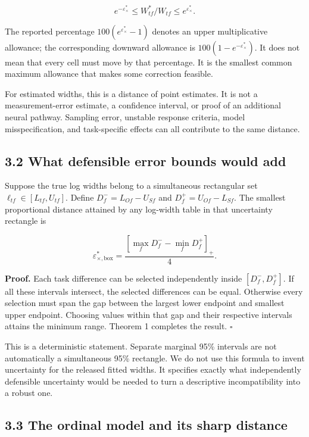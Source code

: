 \documentclass[
  11pt,
]{article}
\let\ctdoldsubsection\subsection
\renewcommand{\subsection}{\Needspace{6\baselineskip}\ctdoldsubsection}
\begin{document}
\[
e^{-\varepsilon_\times^*}
\leq W^*_{tf}/W_{tf}
\leq e^{\varepsilon_\times^*}.
\]

The reported percentage \(100(e^{\varepsilon_\times^*}-1)\) denotes an
upper multiplicative allowance; the corresponding downward allowance is
\(100(1-e^{-\varepsilon_\times^*})\). It does not mean that every cell
must move by that percentage. It is the smallest common maximum
allowance that makes some correction feasible.

For estimated widths, this is a distance of point estimates. It is not a
measurement-error estimate, a confidence interval, or proof of an
additional neural pathway. Sampling error, unstable response criteria,
model misspecification, and task-specific effects can all contribute to
the same distance.

\hypertarget{what-defensible-error-bounds-would-add}{%
\subsection{3.2 What defensible error bounds would
add}\label{what-defensible-error-bounds-would-add}}

Suppose the true log widths belong to a simultaneous rectangular set
\(\ell_{tf}\in[L_{tf},U_{tf}]\). Define \(D_f^-=L_{Of}-U_{Sf}\) and
\(D_f^+=U_{Of}-L_{Sf}\). The smallest proportional distance attained by
any log-width table in that uncertainty rectangle is

\[
\varepsilon_{\times,\mathrm{box}}^*
=\frac{[\max_f D_f^- -\min_f D_f^+]_+}{4}.
\]

\textbf{Proof.} Each task difference can be selected independently
inside \([D_f^-,D_f^+]\). If all these intervals intersect, the selected
differences can be equal. Otherwise every selection must span the gap
between the largest lower endpoint and smallest upper endpoint. Choosing
values within that gap and their respective intervals attains the
minimum range. Theorem 1 completes the result. \(\square\)

This is a deterministic statement. Separate marginal 95\% intervals are
not automatically a simultaneous 95\% rectangle. We do not use this
formula to invent uncertainty for the released fitted widths. It
specifies exactly what independently defensible uncertainty would be
needed to turn a descriptive incompatibility into a robust one.

\hypertarget{the-ordinal-model-and-its-sharp-distance}{%
\subsection{3.3 The ordinal model and its sharp
distance}\label{the-ordinal-model-and-its-sharp-distance}}
\end{document}

